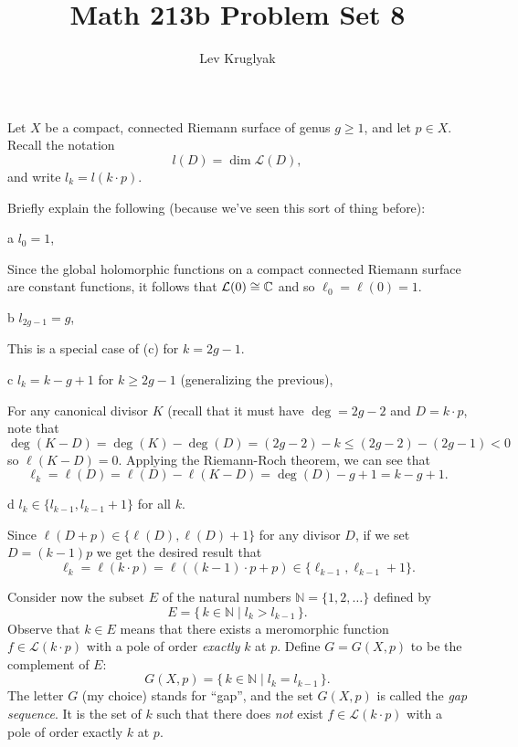 \documentclass[expanded]{lkx_pset}
\title{Math 213b Problem Set 8}
\author{Lev Kruglyak}
\begin{document}
\maketitle

\begin{problem}{1}
Let $X$ be a compact, connected Riemann surface of genus $g\ge1$, and
let
$p\in X$. Recall the notation
\[
	l(D) = \dim \mathcal{L}(D),
\]
and write $l_{k} = l(k\cdot p)$.
\end{problem}

\begin{solution}
	Briefly explain the following (because we've seen this sort of thing
	before):
	\begin{part}{a}
		$l_{0} = 1$,
	\end{part}

	Since the global holomorphic functions on a compact connected Riemann surface are constant functions, it follows that $\mathcal{L}(0)\cong \mathbb{C}$ and so $\ell_0 = \ell(0)=1$.

	\begin{part}{b}
		$l_{2g-1} = g$,
	\end{part}

	This is a special case of (c) for $k=2g-1$.

	\begin{part}{c}
		$l_{k} = k-g+1$ for $k\ge 2g-1$ (generalizing the
		previous),
	\end{part}

	For any canonical divisor $K$ (recall that it must have $\deg = 2g-2$ and $D=k\cdot p$, note that
	\[
		\deg(K-D) = \deg(K) -  \deg(D) = (2g-2) - k \leq (2g-2) - (2g-1) < 0
	\]
	so $\ell(K-D)=0$. Applying the Riemann-Roch theorem, we can see that
	\[
		\ell_k = \ell(D) = \ell(D) - \ell(K-D) = \deg(D)-g+1 = k-g+1.
	\]

	\begin{part}{d}
		$l_{k} \in \{ l_{k-1}, l_{k-1}+1 \}$ for all $k$.
	\end{part}

	Since $\ell(D+p)\in \{ \ell(D), \ell(D)+1\}$ for any divisor $D$, if we set $D= (k-1)p$ we get the desired result that
	\[\ell_k=\ell(k\cdot p)= \ell((k-1)\cdot p + p) \in \{ \ell_{k-1}, \ell_{k-1}+1\}.\]

	\begin{part}{}
		Consider now the subset $E$ of the natural numbers $\mathbb{N}=\{ 1, 2,
			\dots \}$ defined by
		\[
			E = \{ \, k\in \mathbb{N} \mid l_{k} > l_{k-1} \, \}.
		\]
		Observe that $k \in E$ means that there exists a meromorphic function
		$f \in \mathcal{L}(k \cdot p)$ with a pole of order \emph{exactly} $k$ at
		$p$. Define $G=G(X,p)$ to be the complement of $E$:
		\[
			G(X,p) = \{ \, k \in \mathbb{N} \mid l_{k}=l_{k-1} \, \}.
		\]
		The letter $G$ (my choice) stands for ``gap'', and the set $G(X,p)$ is
		called the \emph{gap sequence}. It is the set of $k$ such that there
		does \emph{not} exist $f\in \mathcal{L}(k\cdot p)$ with a pole of order
		exactly $k$ at $p$.
	\end{part}


\end{solution}
\end{document}
